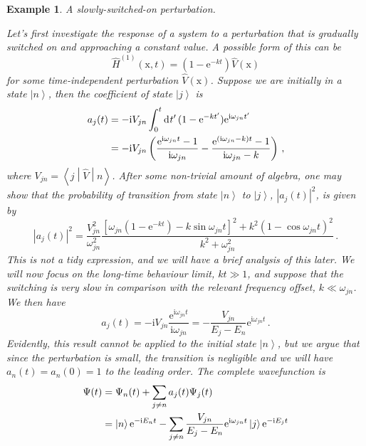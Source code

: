 \documentclass{article}
\theoremstyle{plain}\theoremheaderfont{\normalfont\itshape}\theorembodyfont{\rmfamily}\theoremseparator{.}\newtheorem*{rem}{Remark}\newtheorem*{ex}{Example}\newtheorem*{proof}{Proof}\newtheorem*{altp}{Alternative proof}
\theoremstyle{plain}\theoremheaderfont{\normalfont\bfseries}\theorembodyfont{\rmfamily}\theoremseparator{.}\newtheorem{thm}{Theorem}[section]\newtheorem{lem}[thm]{Lemma}\newtheorem{prop}[thm]{Proposition}\newtheorem*{cor}{Corollary}\newtheorem{defn}[thm]{Definition}\newtheorem{clm}[thm]{Claim}\newtheorem{clminproof}{Claim}
\theoremstyle{break}\theoremheaderfont{\normalfont\itshape}\theorembodyfont{\rmfamily}\theoremseparator{.\medskip}\newtheorem*{proofskip}{Proof}\newtheorem*{exs}{Examples}\newtheorem*{rems}{Remarks}
\theoremstyle{break}\theoremheaderfont{\normalfont\bfseries}\theorembodyfont{\rmfamily}\theoremseparator{.\medskip}\newtheorem{lemskip}[thm]{Lemma}\newtheorem{defnskip}[thm]{Definition}\newtheorem{propskip}[thm]{Proposition}\newtheorem{thmskip}[thm]{Theorem}
\numberwithin{equation}{section}
\newcommand{\ii}{\mathrm{i}}
\newcommand{\ee}{\mathrm{e}}
\newcommand{\dd}[2][]{\mathrm{d}^{#1} #2\,}
\newcommand{\ket}[1]{\left| #1 \right\rangle}
\newcommand{\mel}[3]{\left\langle #1 \middle| #2 \middle| #3 \right\rangle}
\newcommand{\vb}[1]{\bm{\mathrm{#1}}}
\newcommand{\abs}[1]{\left| #1 \right|}
\begin{document}
    \begin{ex}
        \textit{A slowly-switched-on perturbation.}

        Let's first investigate the response of a system to a perturbation that is gradually switched on and approaching a constant value. A possible form of this can be
        \begin{equation}
            \hat{H}^{(1)}(\vb{x},t)=(1-\ee^{-kt})\hat{V}(\vb{x})
        \end{equation}
        for some time-independent perturbation \(\hat{V}(\vb{x})\). Suppose we are initially in a state \(\ket{n}\), then the coefficient of state \(\ket{j}\) is
        \begin{align}
            a_j(t)&=-\ii V_{jn}\int_{0}^{t}\dd{t'}(1-\ee^{-kt'})\ee^{\ii\omega_{jn}t'}\notag\\
            &=-\ii V_{jn}\left(\frac{\ee^{\ii\omega_{jn}t}-1}{\ii\omega_{jn}}-\frac{\ee^{(\ii\omega_{jn}-k)t}-1}{\ii\omega_{jn}-k}\right)\,,
        \end{align}
        where \(V_{jn}=\mel{j}{\hat{V}}{n}\). After some non-trivial amount of algebra, one may show that the probability of transition from state \(\ket{n}\) to \(\ket{j}\), \(\abs{a_j(t)}^2\), is given by
        \begin{equation}\label{two_level_transition_probability}
            \abs{a_j(t)}^2=\frac{V_{jn}^2}{\omega_{jn}^2}\frac{[\omega_{jn}(1-\ee^{-kt})-k\sin\omega_{jn}t]^2+k^2(1-\cos\omega_{jn}t)^2}{k^2+\omega_{jn}^2}\,.
        \end{equation}
        This is not a tidy expression, and we will have a brief analysis of this later. We will now focus on the long-time behaviour limit, \(kt\gg 1\), and suppose that the switching is very slow in comparison with the relevant frequency offset, \(k\ll\omega_{jn}\). We then have
        \begin{equation}
            a_j(t)=-\ii V_{jn}\frac{\ee^{\ii\omega_{jn}t}}{\ii\omega_{jn}}=-\frac{V_{jn}}{E_j-E_n}\ee^{\ii\omega_{jn}t}\,.
        \end{equation}
        Evidently, this result cannot be applied to the initial state \(\ket{n}\), but we argue that since the perturbation is small, the transition is negligible and we will have \(a_n(t)=a_n(0)=1\) to the leading order. The complete wavefunction is
        \begin{align}
            \Psi(t)&=\Psi_n(t)+\sum_{j\ne n}a_j(t)\Psi_j(t)\notag\\
            &=\ket{n} \ee^{-\ii E_n t}-\sum_{j\ne n}\frac{V_{jn}}{E_j-E_n}\ee^{\ii\omega_{jn}t}\ket{j}\ee^{-\ii E_j t}\notag\\

\end{align}
\end{ex}
\end{document}
